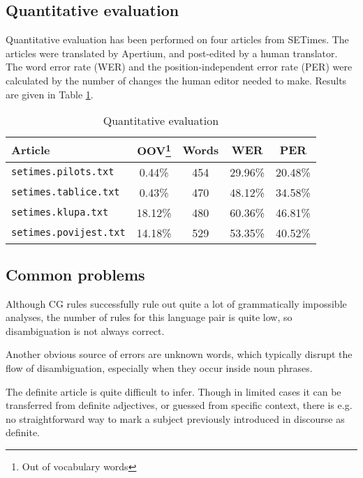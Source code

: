 \documentclass{book}
\begin{document}
\subsection*{Quantitative evaluation}

Quantitative evaluation has been performed on four articles from SETimes. The articles
were translated by Apertium, and post-edited by a human translator. The word error rate (WER)
and the position-independent error rate (PER) were calculated by the number of changes the
human editor needed to make. Results are given in Table \ref{tab:quantitative}.

\begin{savenotes}
\begin{table}
\begin{center}
\begin{tabular}{l|c|c|c|c}
Article & OOV\footnote{Out of vocabulary words} & Words & WER & PER \\
\hline
\texttt{setimes.pilots.txt} & 0.44\% & 454 & 29.96\% & 20.48\% \\
\texttt{setimes.tablice.txt} & 0.43\% & 470 & 48.12\% & 34.58\% \\
\texttt{setimes.klupa.txt} & 18.12\% & 480 & 60.36\% & 46.81\% \\
\texttt{setimes.povijest.txt} & 14.18\% & 529 & 53.35\% & 40.52\% \\
\hline
\end{tabular}
\caption{Quantitative evaluation}
\label{tab:quantitative}
\end{center}
\end{table}
\end{savenotes}



\subsection*{Common problems}

Although CG rules successfully rule out quite a lot of
grammatically impossible analyses, the number of rules for this language pair
is quite low, so disambiguation is not always correct.

Another obvious source of errors are unknown words, which typically disrupt 
the flow of disambiguation, especially when they occur inside noun phrases.

The definite article is quite difficult to infer. Though in limited
cases it can be transferred from definite adjectives, or guessed from
specific context, there is e.g. no straightforward way to mark a subject previously
introduced in discourse as definite.
\end{document}
